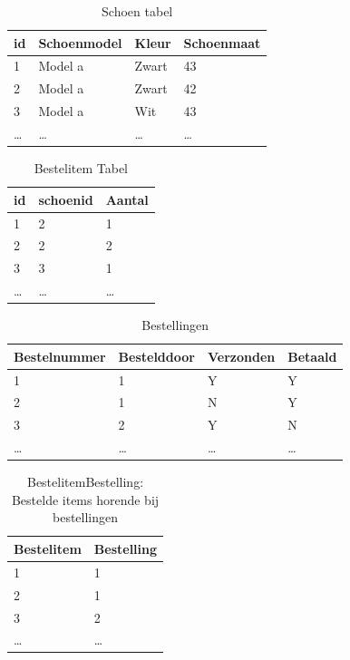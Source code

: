 \documentclass[10pt]{article}
\begin{document}
\begin{table}[hp]
  \centering
  \begin{tabular}{l|l|l|l}
    \textbf{id} & \textbf{Schoenmodel} & \textbf{Kleur} & \textbf{Schoenmaat} \\
    \hline
    1 & Model a              & Zwart          & 43 \\
    2 & Model a              & Zwart          & 42 \\
    3 & Model a              & Wit            & 43 \\
    \ldots & \ldots          & \ldots         & \ldots \\
  \end{tabular}
  \caption{Schoen tabel}
  \label{tab:schoen}
\end{table}

\begin{table}[hp]
  \centering
  \begin{tabular}{l|l|l}
    \textbf{id} & \textbf{schoenid} & \textbf{Aantal} \\\hline
    1           & 2                 & 1               \\
    2           & 2                 & 2               \\
    3           & 3                 & 1               \\
    \ldots      & \ldots            & \ldots          \\
  \end{tabular}
  \caption{Bestelitem Tabel}
  \label{tab:bestelitem}
\end{table}

\begin{table}[hp]
  \centering
  \begin{tabular}{l|l|l|l}
    \textbf{Bestelnummer} & \textbf{Bestelddoor} & \textbf{Verzonden} 
    & \textbf{Betaald} \\
    \hline
    1 & 1                &  Y & Y \\
    2 & 1                &  N & Y \\
    3 & 2                & Y  & N \\
    \ldots & \ldots & \ldots & \ldots \\
  \end{tabular}
  \caption{Bestellingen}
  \label{tab:bestellingen}
\end{table}

\begin{table}[hp]
  \centering
  \begin{tabular}{l|l}
    \textbf{Bestelitem} & \textbf{Bestelling}\\ 
    \hline
    1      & 1      \\
    2      & 1      \\
    3      & 2      \\
    \ldots & \ldots \\
  \end{tabular}
  \caption{BestelitemBestelling: Bestelde items horende bij bestellingen}
  \label{tab:bestelitembestelling}
\end{table}
\end{document}

